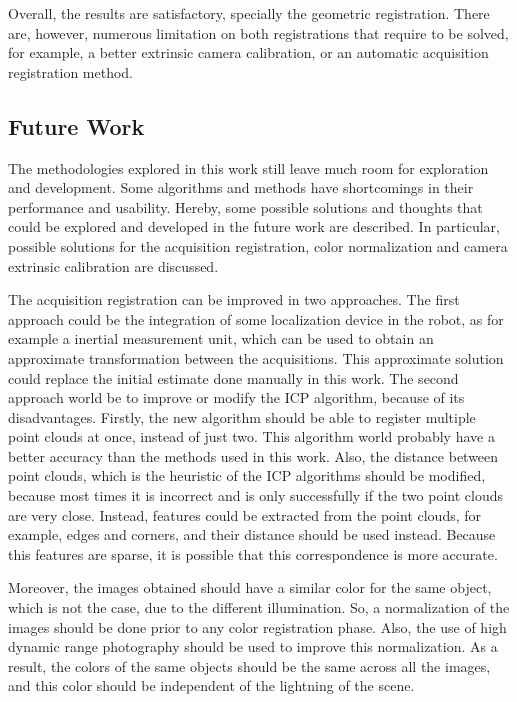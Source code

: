 Overall, the results are satisfactory, specially the geometric registration. There are, however, numerous limitation on both registrations that require to be solved, for example, a better extrinsic camera calibration, or an automatic acquisition registration method.

\subsection{Future Work}
\label{section:future-work}

The methodologies explored in this work still leave much room for exploration and development. Some algorithms and methods have shortcomings in their performance and usability. Hereby, some possible solutions and thoughts that could be explored and developed in the future work are described. In particular, possible solutions for the acquisition registration, color normalization and camera extrinsic calibration are discussed.

The acquisition registration can be improved in two approaches. The first approach could be the integration of some localization device in the robot, as for example a inertial measurement unit, which can be used to obtain an approximate transformation between the acquisitions. This approximate solution could replace the initial estimate done manually in this work. The second approach world be to improve or modify the ICP algorithm, because of its disadvantages. Firstly, the new algorithm should be able to register multiple point clouds at once, instead of just two. This algorithm world probably have a better accuracy than the methods used in this work. Also, the distance between point clouds, which is the heuristic of the ICP algorithms should be modified, because most times it is incorrect and is only successfully if the two point clouds are very close. Instead, features could be extracted from the point clouds, for example, edges and corners, and their distance should be used instead. Because this features are sparse, it is possible that this correspondence is more accurate.

Moreover, the images obtained should have a similar color for the same object, which is not the case, due to the different illumination. So, a normalization of the images should be done prior to any color registration phase. Also, the use of high dynamic range photography should be used to improve this normalization. As a result, the colors of the same objects should be the same across all the images, and this color should be independent of the lightning of the scene.

